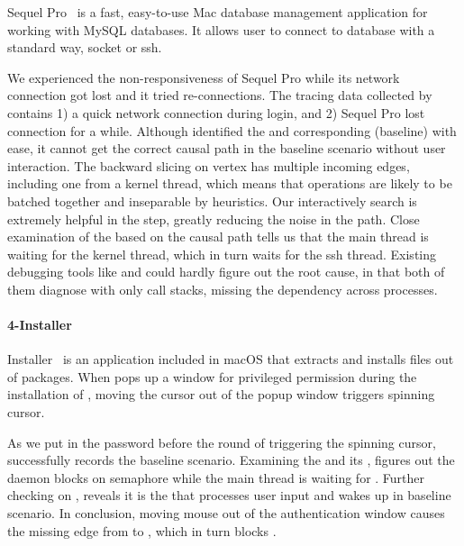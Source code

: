 Sequel Pro~\cite{SequelPro} is a fast, easy-to-use Mac database management
application for working with MySQL databases. It allows user to connect to
database with a standard way, socket or ssh.

We experienced the non-responsiveness of Sequel Pro while its network connection
got lost and it tried re-connections. The tracing data collected by \xxx
contains 1) a quick network connection during login, and 2) Sequel Pro lost
connection for a while. Although \xxx identified the \spinningnode and
corresponding (baseline) \similarnode with ease, it cannot get the correct
causal path in the baseline scenario without user interaction. The backward
slicing on vertex has multiple incoming edges, including one from a kernel
thread, which means that operations are likely to be batched together and
inseparable by heuristics. Our interactively search is extremely helpful
in the step, greatly reducing the noise in the path. Close examination of
the \spinningnode based on the causal path tells us that the main thread is
waiting for the kernel thread, which in turn waits for the ssh thread. Existing
debugging tools like  and  could hardly figure out the
root cause, in that both of them diagnose with only call stacks, missing the
dependency across processes.

\paragraph{4-Installer}

Installer~\cite{Installer} is an application included in macOS that extracts and
installs files out of  packages. When  pops up a window
for privileged permission during the installation of ,
moving the cursor out of the popup window triggers spinning cursor.

As we put in the password before the round of triggering the spinning cursor,
\xxx successfully records the baseline scenario. Examining the \spinningnode and
its \similarnode, \xxx figures out the daemon  blocks on semaphore
while the main thread is waiting for . Further checking on ,
\xxx reveals it is the  that processes user input and wakes
up  in baseline scenario. In conclusion, moving mouse out of the
authentication window causes the missing edge from  to
, which in turn blocks .

